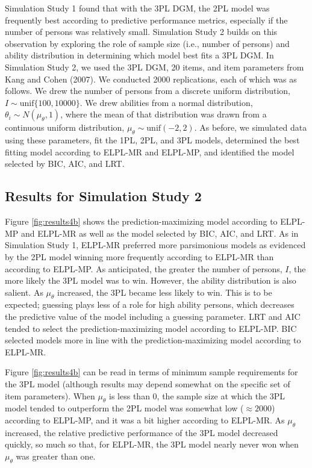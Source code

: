 \documentclass[
  english,
  man,floatsintext]{apa7}
\begin{document}
Simulation Study 1 found that with the 3PL DGM, the 2PL model was frequently best according to predictive performance metrics, especially if the number of persons was relatively small. Simulation Study 2 builds on this observation by exploring the role of sample size (i.e., number of persons) and ability distribution in determining which model best fits a 3PL DGM. In Simulation Study 2, we used the 3PL DGM, 20 items, and item parameters from Kang and Cohen (2007). We conducted 2000 replications, each of which was as follows. We drew the number of persons from a discrete uniform distribution, \(I \sim \text{unif}\{100, 10000\}\). We drew abilities from a normal distribution, \(\theta_i \sim N(\mu_{\theta} , 1)\), where the mean of that distribution was drawn from a continuous uniform distribution, \(\mu_{\theta} \sim \text{unif}(-2, 2)\). As before, we simulated data using these parameters, fit the 1PL, 2PL, and 3PL models, determined the best fitting model according to ELPL-MR and ELPL-MP, and identified the model selected by BIC, AIC, and LRT.

\hypertarget{results-for-simulation-study-2}{%
\subsection{Results for Simulation Study 2}\label{results-for-simulation-study-2}}

Figure \ref{fig:results4b} shows the prediction-maximizing model according to ELPL-MP and ELPL-MR as well as the model selected by BIC, AIC, and LRT. As in Simulation Study 1, ELPL-MR preferred more parsimonious models as evidenced by the 2PL model winning more frequently according to ELPL-MR than according to ELPL-MP. As anticipated, the greater the number of persons, \(I\), the more likely the 3PL model was to win. However, the ability distribution is also salient. As \(\mu_{\theta}\) increased, the 3PL became less likely to win. This is to be expected; guessing plays less of a role for high ability persons, which decreases the predictive value of the model including a guessing parameter. LRT and AIC tended to select the prediction-maximizing model according to ELPL-MP. BIC selected models more in line with the prediction-maximizing model according to ELPL-MR.

Figure \ref{fig:results4b} can be read in terms of minimum sample requirements for the 3PL model (although results may depend somewhat on the specific set of item parameters). When \(\mu_{\theta}\) is less than 0, the sample size at which the 3PL model tended to outperform the 2PL model was somewhat low (\(\approx 2000\)) according to ELPL-MP, and it was a bit higher according to ELPL-MR. As \(\mu_{\theta}\) increased, the relative predictive performance of the 3PL model decreased quickly, so much so that, for ELPL-MR, the 3PL model nearly never won when \(\mu_{\theta}\) was greater than one.
\end{document}
